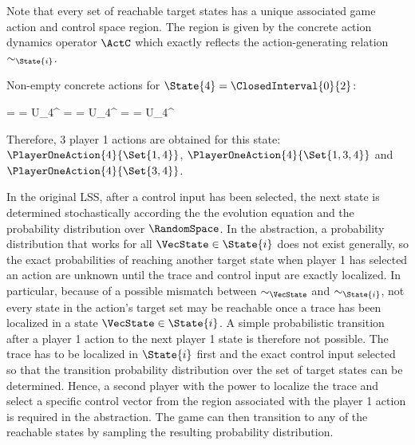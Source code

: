     \startformula
         \EndPeriod
    \stopformula

    Note that every set of reachable target states has a unique associated game action and control space region.
    The region is given by the concrete action dynamics operator $\ActC$ which exactly reflects the action-generating relation $\sim_{\State {i}}$.

    Non-empty concrete actions for $\State{4} = \ClosedInterval{0}{2}$:

    \startformula
        \startalign[n=3,align={left,left,left}]
            \NC {}
            \NC = 
            \NC = U_4^{} \EndComma
            \NR
            \NC {}
            \NC = 
            \NC = U_4^{} \EndComma
            \NR
            \NC {}
            \NC = 
            \NC = U_4^{} \EndPeriod
            \NR
        \stopalign
    \stopformula

    Therefore, 3 player 1 actions are obtained for this state: $\PlayerOneAction{4}{\Set{1, 4}}$, $\PlayerOneAction{4}{\Set{1, 3, 4}}$ and $\PlayerOneAction{4}{\Set{3, 4}}$.

\stopsubsection


\startsubsection[title={Player 2},reference=sec:abstraction-graph-playertwo]

    In the original LSS, after a control input has been selected, the next state is determined stochastically according the the evolution equation and the probability distribution over $\RandomSpace$.
    In the abstraction, a probability distribution that works for all $\VecState \in \State{i}$ does not exist generally, so the exact probabilities of reaching another target state when player 1 has selected an action are unknown until the trace and control input are exactly localized.
    In particular, because of a possible mismatch between $\sim_\VecState$ and $\sim_{\State{i}}$, not every state in the action's target set may be reachable once a trace has been localized in a state $\VecState \in \State{i}$.
    A simple probabilistic transition after a player 1 action to the next player 1 state is therefore not possible.
    The trace has to be localized in $\State{i}$ first and the exact control input selected so that the transition probability distribution over the set of target states can be determined.
    Hence, a second player with the power to localize the trace and select a specific control vector from the region associated with the player 1 action is required in the abstraction.
    The game can then transition to any of the reachable states by sampling the resulting probability distribution.

